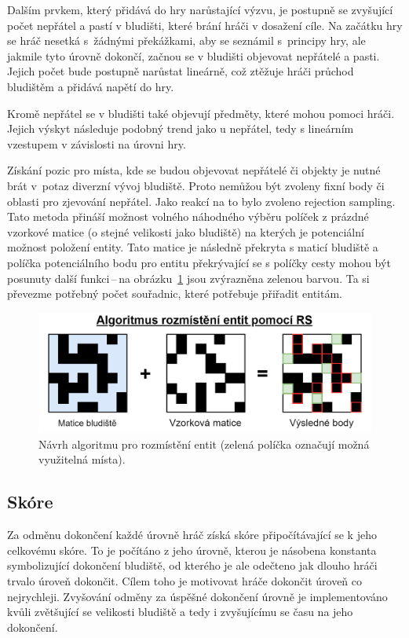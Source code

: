 Dalším prvkem, který přidává do hry narůstající výzvu, je postupně se zvyšující počet nepřátel a pastí v bludišti, které brání hráči v dosažení cíle. Na začátku hry se hráč nesetká s~žádnými překážkami, aby se seznámil s~principy hry, ale jakmile tyto úrovně dokončí, začnou se v bludišti objevovat nepřátelé a pasti. Jejich počet bude postupně narůstat lineárně, což ztěžuje hráči průchod bludištěm a přidává napětí do hry.

Kromě nepřátel se v bludišti také objevují předměty, které mohou pomoci hráči. Jejich výskyt následuje podobný trend jako u nepřátel, tedy s lineárním vzestupem v závislosti na úrovni hry.

Získání pozic pro místa, kde se budou objevovat nepřátelé či objekty je nutné brát v~potaz diverzní vývoj bludiště. Proto nemůžou být zvoleny fixní body či oblasti pro zjevování nepřátel. Jako reakcí na to bylo zvoleno rejection sampling. Tato metoda přináší možnost volného náhodného výběru políček z prázdné vzorkové matice (o stejné velikosti jako bludiště) na kterých je potenciální možnost položení entity. Tato matice je následně překryta s maticí bludiště a políčka potenciálního bodu pro entitu překrývající se s políčky cesty mohou být posunuty další funkci\,--\,na obrázku~\ref{fig:rozmisteni_rs} jsou zvýrazněna zelenou barvou. Ta si převezme potřebný počet souřadnic, které potřebuje přiřadit entitám.

\begin{figure}[hb]
    \centering
    \includegraphics[width=\textwidth]{obrazky-figures/ch3/rozmisteni_rs.png}
    \caption{Návrh algoritmu pro rozmístění entit (zelená políčka označují možná využitelná místa).}
    \label{fig:rozmisteni_rs}
\end{figure}


\subsection*{Skóre}
Za odměnu dokončení každé úrovně hráč získá skóre připočítávající se k jeho celkovému skóre. To je počítáno z jeho úrovně, kterou je násobena konstanta symbolizující dokončení bludiště, od kterého je ale odečteno jak dlouho hráči trvalo úroveň dokončit. Cílem toho je motivovat hráče dokončit úroveň co nejrychleji. Zvyšování odměny za úspěšné dokončení úrovně je implementováno kvůli zvětšující se velikosti bludiště a tedy i zvyšujícímu se času na jeho dokončení.

